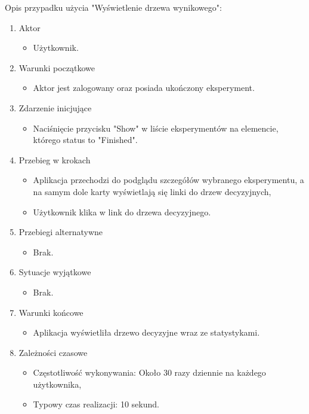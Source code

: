 Opis przypadku użycia "Wyświetlenie drzewa wynikowego":
\begin{enumerate}
	\item  Aktor
	\begin{itemize}
		\item Użytkownik. 
	\end{itemize}
	\item Warunki początkowe
	\begin{itemize}
		\item Aktor jest zalogowany oraz posiada ukończony eksperyment.
	\end{itemize}
	\item Zdarzenie inicjujące
	\begin{itemize}
		\item Naciśnięcie przycisku "Show" w liście eksperymentów na elemencie, którego status to "Finished".
	\end{itemize}
	\item Przebieg w krokach
	\begin{itemize}
		\item Aplikacja przechodzi do podglądu szczegółów wybranego eksperymentu, a na samym dole karty wyświetlają się linki do drzew decyzyjnych,
		\item Użytkownik klika w link do drzewa decyzyjnego.
	\end{itemize}
	\item Przebiegi alternatywne
	\begin{itemize}
		\item  Brak.
	\end{itemize}
	\item Sytuacje wyjątkowe
	\begin{itemize}
		\item  Brak.
	\end{itemize}
	\item Warunki końcowe
	\begin{itemize}
	\item  Aplikacja wyświetliła drzewo decyzyjne wraz ze statystykami.
	\end{itemize}
	\item Zależności czasowe
	\begin{itemize}
		\item Częstotliwość wykonywania: Około 30 razy dziennie na każdego użytkownika,
		\item Typowy czas realizacji: 10 sekund.
	\end{itemize}
\end{enumerate}

